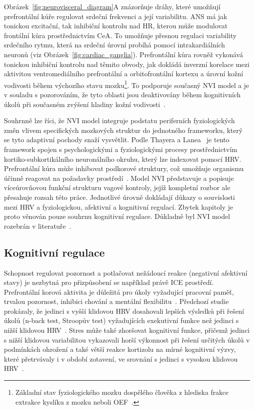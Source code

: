 Obrázek~\ref{fig:neurovisceral_diagram}A znázorňuje dráhy, které umožňují
prefrontální kůře regulovat srdeční frekvenci a její variabilitu. \gls{ANS} má
jak tonickou excitační, tak inhibiční kontrolu nad \gls{HR}, kterou může
modulovat frontální kůra prostřednictvím \gls{CeA}. To umožňuje přesnou regulaci
variability srdečního rytmu, která na srdeční úrovní probíhá pomocí
intrakardiálních neuronů (viz Obrázek~\ref{fig:cardiac_ganglia}). Prefrontální
kůra rovněž vykonává tonickou inhibiční kontrolu nad těmito obvody, jak dokládá
inverzní korelace mezi aktivitou ventromediálního prefrontální a orbitofrontální
kortexu a úrovní kožní vodivosti během výchozího stavu mozku\footnote{Základní
stav fyziologického mozku dospělého člověka z hlediska frakce extrakce kyslíku z
mozku neboli OEF~\cite{Raichle2001}.}. To podporuje současný \gls{NVI} model a je
v souladu s pozorováním, že tyto oblasti jsou deaktivovány během kognitivních
úkolů při současném zvýšení hladiny kožní
vodivosti~\cite{Nagai2004,Raichle2001,Thayer_Lane_2009}.

Souhrnně lze říci, že \gls{NVI} model integruje podstatu periferních
fyziologických změn vlivem specifických mozkových struktur do jednotného
frameworku, který se tyto adaptivní pochody snaží vysvětlit. Podle Thayera a
Lanea~\cite{Thayer_Lane_2000} je tento framework spojen s psychologickými a
fyziologickými procesy prostřednictvím kortiko-subkortikálního neuronálního
okruhu, který lze indexovat pomocí \gls{HRV}. Prefrontální kůra může inhibovat
podkorové struktury, což umožňuje organismu účinně reagovat na požadavky
prostředí~\cite{Thayer_Lane_2009}. Model \gls{NVI} představuje a popisuje
víceúrovňovou funkční strukturu vagové kontroly, jejíž kompletní rozbor ale
přesahuje rozsah této práce. Jednotlivé úrovně dokládají důkazy o souvislosti
mezi \gls{HRV} a fyziologickou, afektivní a kognitivní regulací. Zbytek kapitoly
je proto věnován pouze souhrnu kognitivní regulace. Důkladně byl \gls{NVI} model
rozebrán v literatuře~\cite{Smith_Thayer_Khalsa_Lane_2017,Thayer2009,Thayer_Lane_2009}.

\subsection{Kognitivní regulace}
Schopnost regulovat pozornost a potlačovat nežádoucí reakce (negativní afektivní
stavy) je nezbytná pro přizpůsobení se například právě \gls{ICE} prostředí.
Prefrontální korová aktivita je důležitá pro úkoly vyžadující pracovní paměť,
trvalou pozornost, inhibici chování a mentální
flexibilitu~\cite{Thayer_Lane_2009}. Předchozí studie prokázaly, že jedinci s
vyšší klidovou \gls{HRV} dosahovali lepších výsledků při řešení úkolů (n-back
test, Stroopův test) vyžadujících exekutivní funkce než jedinci s nižší klidovou
\gls{HRV}~\cite{Hansen_Johnsen_Thayer_2003,
Johnsen_Thayer_Laberg_Wormnes_Raadal_Skaret_Kvale_Berg_2003}. Stres může také
zhoršovat kognitivní funkce, přičemž jedinci s nižší klidovou variabilitou
vykazovali horší výkonnost při řešení určitých úkolů v podmínkách ohrožení a
také větší reakce kortizolu na mírné kognitivní výzvy, které přetrvávaly i v
období zotavení, ve srovnání s jedinci s vysokou klidovou
\gls{HRV}~\cite{Thayer_Lane_2009}.

